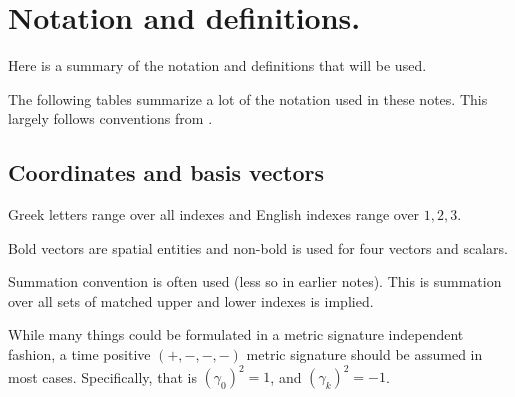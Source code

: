 \chapter{Notation and definitions.}\label{chap:notationTable}

Here is a summary of the notation and definitions that will be used.

The following tables summarize a lot of the notation used in these notes.
This largely follows conventions from \citep{doran2003gap}.

\section{Coordinates and basis vectors}

Greek letters range over all indexes and English indexes range over $1,2,3$.

Bold vectors are spatial entities and non-bold is used for four vectors and scalars.

Summation convention is often used (less so in earlier notes).  This is 
summation over all sets of matched upper and lower indexes is implied.

While many things could be formulated in a metric signature independent
fashion, 
a time positive
$(+,-,-,-)$
metric signature should be assumed in most cases.  Specifically, that is $(\gamma_0)^2 = 1$, and $(\gamma_k)^2 = -1$.

